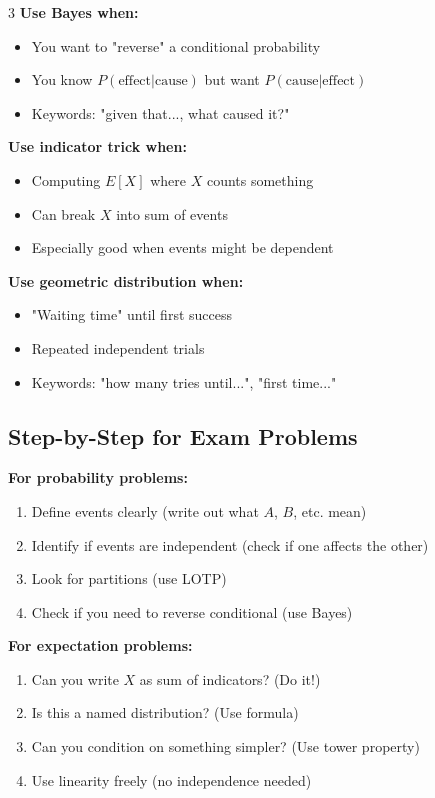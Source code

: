 \documentclass[10pt,landscape]{article}
\begin{document}
\begin{multicols}{3}
\textbf{Use Bayes when:}
\begin{itemize}[leftmargin=*,noitemsep,topsep=0pt]
\item You want to "reverse" a conditional probability
\item You know $P(\text{effect}|\text{cause})$ but want $P(\text{cause}|\text{effect})$
\item Keywords: "given that..., what caused it?"
\end{itemize}

\textbf{Use indicator trick when:}
\begin{itemize}[leftmargin=*,noitemsep,topsep=0pt]
\item Computing $E[X]$ where $X$ counts something
\item Can break $X$ into sum of events
\item Especially good when events might be dependent
\end{itemize}

\textbf{Use geometric distribution when:}
\begin{itemize}[leftmargin=*,noitemsep,topsep=0pt]
\item "Waiting time" until first success
\item Repeated independent trials
\item Keywords: "how many tries until...", "first time..."
\end{itemize}

\subsection{Step-by-Step for Exam Problems}

\textbf{For probability problems:}
\begin{enumerate}[leftmargin=*,noitemsep,topsep=0pt]
\item Define events clearly (write out what $A$, $B$, etc. mean)
\item Identify if events are independent (check if one affects the other)
\item Look for partitions (use LOTP)
\item Check if you need to reverse conditional (use Bayes)
\end{enumerate}

\textbf{For expectation problems:}
\begin{enumerate}[leftmargin=*,noitemsep,topsep=0pt]
\item Can you write $X$ as sum of indicators? (Do it!)
\item Is this a named distribution? (Use formula)
\item Can you condition on something simpler? (Use tower property)
\item Use linearity freely (no independence needed)
\end{enumerate}


\end{multicols}
\end{document}
